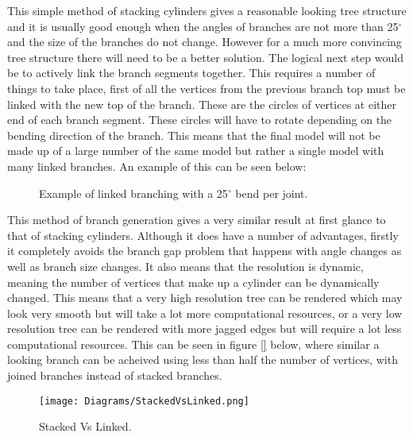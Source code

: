 \FloatBarrier

\noindent
This simple method of stacking cylinders gives a reasonable looking tree structure and it is usually good enough when the angles of branches are not more than 25$^{\circ}$ and the size of the branches do not change. However for a much more convincing tree structure there will need to be a better solution. The logical next step would be to actively link the branch segments together. This requires a number of things to take place, first of all the vertices from the previous branch top must be linked with the new top of the branch. These are the circles of vertices at either end of each branch segment. These circles will have to rotate depending on the bending direction of the branch. This means that the final model will not be made up of a large number of the same model but rather a single model with many linked branches. An example of this can be seen below:

\begin{figure}[htbp]
	{\centering
		\vspace{7px}
		\setlength{\fboxrule}{1pt}
		\caption{Example of linked branching with a 25$^{\circ}$ bend per joint.}
	}
\end{figure}
\FloatBarrier

\noindent
This method of branch generation gives a very similar result at first glance to that of stacking cylinders. Although it does have a number of advantages, firstly it completely avoids the branch gap problem that happens with angle changes as well as branch size changes. It also means that the resolution is dynamic, meaning the number of vertices that make up a cylinder can be dynamically changed. This means that a very high resolution tree can be rendered which may look very smooth but will take a lot more computational resources, or a very low resolution tree can be rendered with more jagged edges but will require a lot less computational resources. This can be seen in figure \ref{} below, where similar a looking branch can be acheived using less than half the number of vertices, with joined branches instead of stacked branches.

\begin{figure}[htbp]
	{\centering
		\vspace{7px}
		\texttt{[image: Diagrams/StackedVsLinked.png]}
		\caption{Stacked Vs Linked.}
	}
\end{figure}
\FloatBarrier



